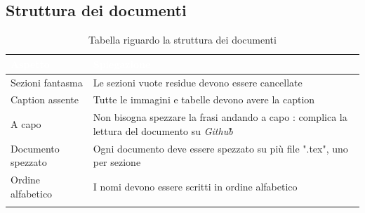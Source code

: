 \subsection{Struttura dei documenti}
{
    \setlength{\freewidth}{\dimexpr\textwidth-10\tabcolsep}
    \renewcommand{\arraystretch}{1.5}
    \centering
    \setlength{\aboverulesep}{0pt}
    \setlength{\belowrulesep}{0pt}
    \begin{longtable}{C{.5\freewidth} C{.5\freewidth}}
       \toprule
    \textcolor{white}{\textbf{Aspetto}}&
    \textcolor{white}{\textbf{Spiegazione}} \\
    \toprule
    \endhead
    Sezioni fantasma & Le sezioni vuote residue devono essere cancellate \\
    Caption assente &  Tutte le immagini e tabelle devono avere la caption \\
    A capo & Non bisogna spezzare la frasi andando a capo : complica la lettura del documento su \textit{Github}\G\\
    Documento spezzato & Ogni documento deve essere spezzato su più file ".tex", uno per sezione \\
    Ordine alfabetico & I nomi devono essere scritti in ordine alfabetico \\
    
    \bottomrule
    \caption{Tabella riguardo la struttura dei documenti}
\end{longtable}    
    
}

